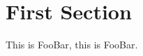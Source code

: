 

\section{First Section}
\def\mytext{FooBar}
\let\yourtext=\mytext

This is \mytext, this is \yourtext.


